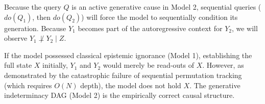 \documentclass[12pt,a4paper]{article}
\begin{document}
Because the query $Q$ is an active generative cause in Model 2, sequential queries ($do(Q_1)$, then $do(Q_2)$) will force the model to sequentially condition its generation. Because $Y_1$ becomes part of the autoregressive context for $Y_2$, we will observe $Y_1 \not\perp Y_2 \mid Z$.

If the model possessed classical epistemic ignorance (Model 1), establishing the full state $X$ initially, $Y_1$ and $Y_2$ would merely be read-outs of $X$. However, as demonstrated by the catastrophic failure of sequential permutation tracking (which requires $O(N)$ depth), the model does not hold $X$. The generative indeterminacy DAG (Model 2) is the empirically correct causal structure.
\end{document}
